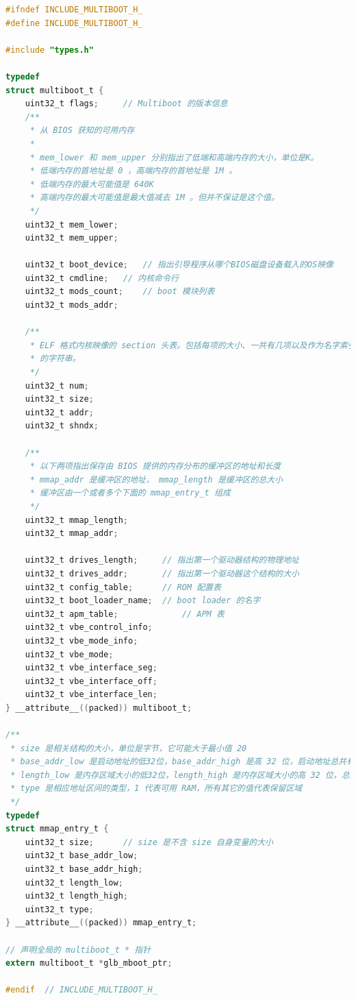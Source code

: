 \begin{lstlisting}[language = C, caption = include/multiboot.h]
#ifndef INCLUDE_MULTIBOOT_H_
#define INCLUDE_MULTIBOOT_H_

#include "types.h"

typedef
struct multiboot_t {
	uint32_t flags;		// Multiboot 的版本信息
	/** 
	 * 从 BIOS 获知的可用内存
	 *
	 * mem_lower 和 mem_upper 分别指出了低端和高端内存的大小，单位是K。
	 * 低端内存的首地址是 0 ，高端内存的首地址是 1M 。
	 * 低端内存的最大可能值是 640K 
	 * 高端内存的最大可能值是最大值减去 1M 。但并不保证是这个值。
	 */
	uint32_t mem_lower;
	uint32_t mem_upper;

	uint32_t boot_device;	// 指出引导程序从哪个BIOS磁盘设备载入的OS映像
	uint32_t cmdline;	// 内核命令行
	uint32_t mods_count;	// boot 模块列表
	uint32_t mods_addr;
	
	/**
	 * ELF 格式内核映像的 section 头表。包括每项的大小、一共有几项以及作为名字索引
	 * 的字符串。
	 */
	uint32_t num;
	uint32_t size;
	uint32_t addr;
	uint32_t shndx;

	/**
	 * 以下两项指出保存由 BIOS 提供的内存分布的缓冲区的地址和长度
	 * mmap_addr 是缓冲区的地址， mmap_length 是缓冲区的总大小
	 * 缓冲区由一个或者多个下面的 mmap_entry_t 组成
	 */
	uint32_t mmap_length;		
	uint32_t mmap_addr;
	
	uint32_t drives_length; 	// 指出第一个驱动器结构的物理地址	
	uint32_t drives_addr; 		// 指出第一个驱动器这个结构的大小
	uint32_t config_table; 		// ROM 配置表
	uint32_t boot_loader_name; 	// boot loader 的名字
	uint32_t apm_table; 	    	// APM 表
	uint32_t vbe_control_info;
	uint32_t vbe_mode_info;
	uint32_t vbe_mode;
	uint32_t vbe_interface_seg;
	uint32_t vbe_interface_off;
	uint32_t vbe_interface_len;
} __attribute__((packed)) multiboot_t;

/**
 * size 是相关结构的大小，单位是字节，它可能大于最小值 20
 * base_addr_low 是启动地址的低32位，base_addr_high 是高 32 位，启动地址总共有 64 位
 * length_low 是内存区域大小的低32位，length_high 是内存区域大小的高 32 位，总共是 64 位
 * type 是相应地址区间的类型，1 代表可用 RAM，所有其它的值代表保留区域
 */
typedef
struct mmap_entry_t {
	uint32_t size; 		// size 是不含 size 自身变量的大小
	uint32_t base_addr_low;
	uint32_t base_addr_high;
	uint32_t length_low;
	uint32_t length_high;
	uint32_t type;
} __attribute__((packed)) mmap_entry_t;

// 声明全局的 multiboot_t * 指针
extern multiboot_t *glb_mboot_ptr;

#endif 	// INCLUDE_MULTIBOOT_H_
\end{lstlisting}

